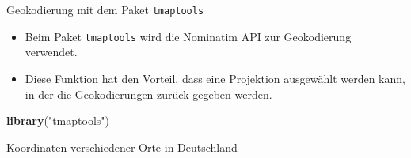 \documentclass[ignorenonframetext,]{beamer}
\newenvironment{Shaded}{\begin{snugshade}}{\end{snugshade}}
\newcommand{\KeywordTok}[1]{\textcolor[rgb]{0.13,0.29,0.53}{\textbf{#1}}}
\newcommand{\DecValTok}[1]{\textcolor[rgb]{0.00,0.00,0.81}{#1}}
\newcommand{\StringTok}[1]{\textcolor[rgb]{0.31,0.60,0.02}{#1}}
\newcommand{\ControlFlowTok}[1]{\textcolor[rgb]{0.13,0.29,0.53}{\textbf{#1}}}
\newcommand{\OperatorTok}[1]{\textcolor[rgb]{0.81,0.36,0.00}{\textbf{#1}}}
\newcommand{\NormalTok}[1]{#1}
\providecommand{\tightlist}{%
  \setlength{\itemsep}{0pt}\setlength{\parskip}{0pt}}
\begin{document}
\begin{frame}[fragile]{Geokodierung mit dem Paket \texttt{tmaptools}}

\begin{itemize}
\tightlist
\item
  Beim Paket \texttt{tmaptools} wird die Nominatim API zur Geokodierung
  verwendet.
\item
  Diese Funktion hat den Vorteil, dass eine Projektion ausgewählt werden
  kann, in der die Geokodierungen zurück gegeben werden.
\end{itemize}

\begin{Shaded}
\begin{Highlighting}[]
\KeywordTok{library}\NormalTok{(}\StringTok{"tmaptools"}\NormalTok{)}
\end{Highlighting}
\end{Shaded}

\end{frame}

\begin{frame}[fragile]{Koordinaten verschiedener Orte in Deutschland}

\begin{Shaded}
\end{Shaded}

\end{frame}
\end{document}
